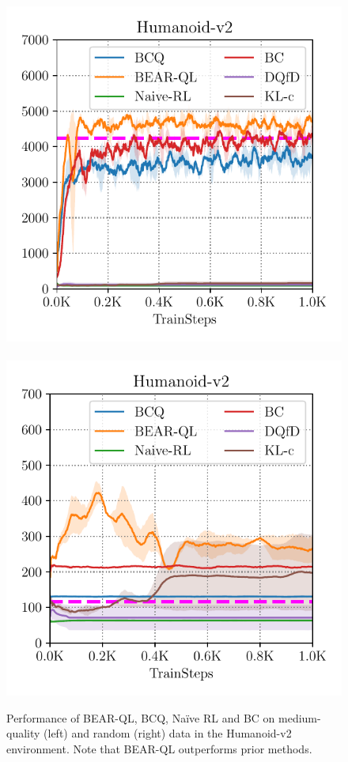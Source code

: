 \begin{figure}
\vspace{-20pt}
        \includegraphics[width=0.49\linewidth]{chapters/bear/images/images_camera_ready/humanoid_mediocre_camera_ready.pdf}
       ~
        \includegraphics[width=0.48\linewidth]{chapters/bear/images/images_camera_ready/humanoid_random_camera_ready.pdf}
      \caption{\footnotesize Performance of BEAR-QL, BCQ, Na\"ive RL and BC on medium-quality (left) and random (right) data in the Humanoid-v2 environment. Note that BEAR-QL outperforms prior methods.}
      \label{fig:humanoid}
\vspace{-10pt}
\end{figure}



